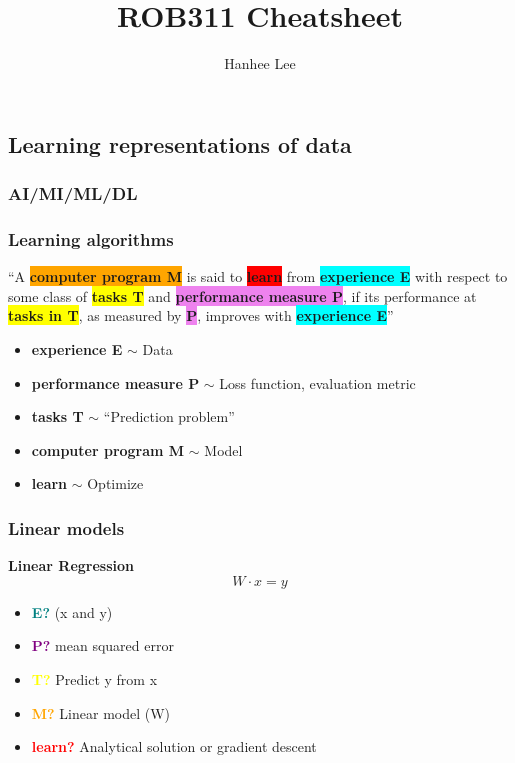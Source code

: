\documentclass{article}
\title{ROB311 Cheatsheet}
\author{Hanhee Lee}
\begin{document}
\subsection{Learning representations of data}
\subsubsection{AI/MI/ML/DL}
\begin{definition}
\end{definition}
\subsubsection{Learning algorithms}
\begin{definition}
    \textquotedblleft A \colorbox{orange}{\textbf{computer program M}} is said to \colorbox{red}{\textbf{learn}} from \colorbox{cyan}{\textbf{experience E}} with respect to some class of \colorbox{yellow}{\textbf{tasks T}} and \colorbox{violet}{\textbf{performance measure P}}, if its performance at \colorbox{yellow}{\textbf{tasks in T}}, as measured by \colorbox{violet}{\textbf{P}}, improves with \colorbox{cyan}{\textbf{experience E}}\textquotedblright

\vspace{1em}

\noindent
\begin{itemize}
    \item \textbf{\color{cyan}experience E} $\sim$ Data
    \item \textbf{\color{violet}performance measure P} $\sim$ Loss function, evaluation metric
    \item \textbf{\color{yellow}tasks T} $\sim$ ``Prediction problem''
    \item \textbf{\color{orange}computer program M} $\sim$ Model
    \item \textbf{\color{red}learn} $\sim$ Optimize
\end{itemize}

\end{definition}

\subsubsection{Linear models}
\begin{definition} \textbf{Linear Regression}
    \begin{equation}
        W \cdot x = y
    \end{equation}
    \begin{itemize}
        \item \textcolor{teal}{\textbf{E?}} (x and y)
        \item \textcolor{purple}{\textbf{P?}} mean squared error
        \item \textcolor{yellow}{\textbf{T?}} Predict y from x
        \item \textcolor{orange}{\textbf{M?}} Linear model (W)
        \item \textcolor{red}{\textbf{learn?}} Analytical solution or gradient descent
    \end{itemize}
\end{definition}
\end{document}
